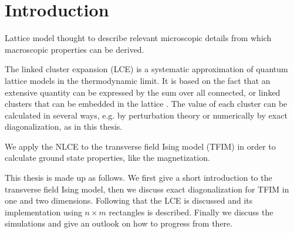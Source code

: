 \documentclass{article}
\begin{document}
\tableofcontents
\newpage


\section{Introduction}
Lattice model thought to describe relevant microscopic details from
which macroscopic properties can be derived.

The linked cluster expansion (LCE) is a systematic approximation of quantum
lattice models in the thermodynamic limit. It is based on the fact
that an extensive quantity can be expressed by the sum over all
connected, or linked clusters that can be embedded in the lattice
\cite{Series,Rigol}. The value of each cluster can be calculated in
several ways, e.g. by perturbation theory \cite{Series} or numerically
by exact diagonalization, as in this thesis.

We apply the NLCE to the transverse field Ising model (TFIM) in order to
calculate ground state properties, like the magnetization.

This thesis is made up as follows. We first give a short introduction
to the transverse field Ising model, then we discuss exact
diagonalization for TFIM in one and two dimensions. Following that the
LCE is discussed and its implementation using $n \times m$ rectangles
is described. Finally we discuss the simulations and give an outlook
on how to progress from there.

\newpage
\end{document}
